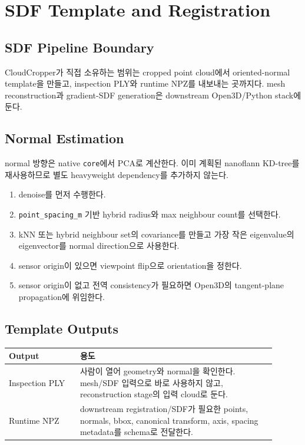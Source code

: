 \chapter{SDF Template and Registration}

\section{SDF Pipeline Boundary}

CloudCropper가 직접 소유하는 범위는 cropped point cloud에서 oriented-normal
template을 만들고, inspection PLY와 runtime NPZ를 내보내는 곳까지다. mesh
reconstruction과 gradient-SDF generation은 downstream Open3D/Python stack에 둔다.

\section{Normal Estimation}

normal 방향은 native \texttt{core}에서 PCA로 계산한다. 이미 계획된 nanoflann
KD-tree를 재사용하므로 별도 heavyweight dependency를 추가하지 않는다.

\begin{enumerate}
  \item denoise를 먼저 수행한다.
  \item \texttt{point\_spacing\_m} 기반 hybrid radius와 max neighbour count를
  선택한다.
  \item kNN 또는 hybrid neighbour set의 covariance를 만들고 가장 작은 eigenvalue의
  eigenvector를 normal direction으로 사용한다.
  \item sensor origin이 있으면 viewpoint flip으로 orientation을 정한다.
  \item sensor origin이 없고 전역 consistency가 필요하면 Open3D의 tangent-plane
  propagation에 위임한다.
\end{enumerate}

\section{Template Outputs}

\begin{longtable}{p{0.24\linewidth}p{0.66\linewidth}}
\toprule
\textbf{Output} & \textbf{용도} \\
\midrule
Inspection PLY & 사람이 열어 geometry와 normal을 확인한다. mesh/SDF 입력으로 바로
사용하지 않고, reconstruction stage의 입력 cloud로 둔다. \\
Runtime NPZ & downstream registration/SDF가 필요한 points, normals, bbox,
canonical transform, axis, spacing metadata를 schema로 전달한다. \\
\bottomrule
\end{longtable}

